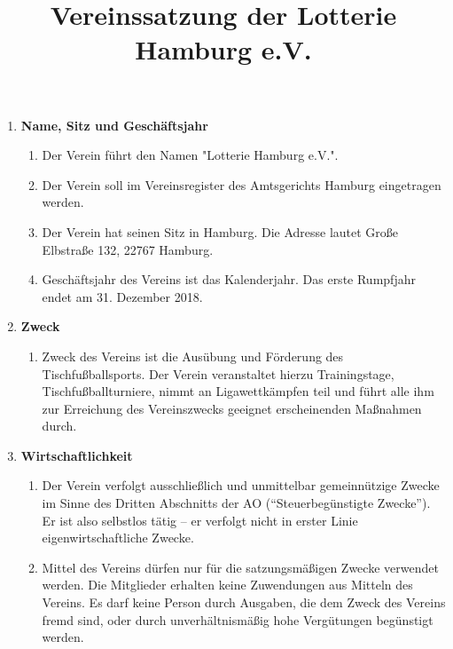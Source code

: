 \documentclass{article}
\title{\textsf{\textbf{Vereinssatzung der Lotterie Hamburg e.V.}}}
\author{}
\date{}
\begin{document}
\maketitle

\begin{enumerate}[§ 1.]
\item \textsf{\textbf{Name, Sitz und Geschäftsjahr}}
\begin{enumerate}
\item Der Verein führt den Namen "Lotterie Hamburg e.V.".
\item Der Verein soll im Vereinsregister des Amtsgerichts Hamburg eingetragen werden.
\item Der Verein hat seinen Sitz in Hamburg. Die Adresse lautet Große Elbstraße 132, 22767 Hamburg.
\item Geschäftsjahr des Vereins ist das Kalenderjahr. Das erste Rumpfjahr endet am 31. Dezember 2018.
\end{enumerate}

\item \textsf{\textbf{Zweck}}
\begin{enumerate}
\item Zweck des Vereins ist die Ausübung und Förderung des Tischfußballsports. Der Verein veranstaltet hierzu Trainingstage, Tischfußballturniere, nimmt an Ligawettkämpfen teil und führt alle ihm zur Erreichung des Vereinszwecks geeignet erscheinenden Maßnahmen durch.
\end{enumerate}

\item \textsf{\textbf{Wirtschaftlichkeit}}
\begin{enumerate}
\item Der Verein verfolgt ausschließlich und unmittelbar gemeinnützige Zwecke im Sinne des Dritten Abschnitts der AO ("`Steuerbegünstigte Zwecke"'). Er ist also selbstlos tätig -- er verfolgt nicht in erster Linie eigenwirtschaftliche Zwecke.
\item Mittel des Vereins dürfen nur für die satzungsmäßigen Zwecke verwendet werden. Die Mitglieder erhalten keine Zuwendungen aus Mitteln des Vereins. Es darf keine Person durch Ausgaben, die dem Zweck des Vereins fremd sind, oder durch unverhältnismäßig hohe Vergütungen begünstigt werden.
\end{enumerate}


\end{enumerate}
\end{document}
